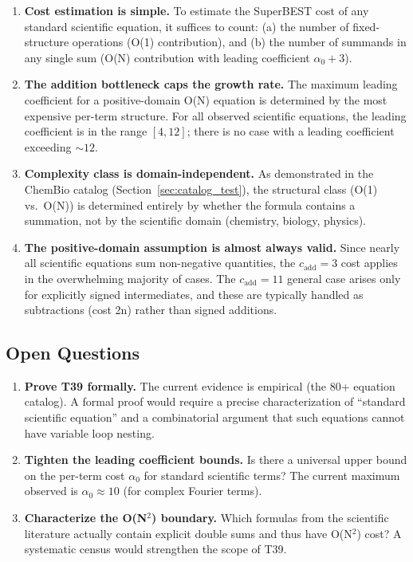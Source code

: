 \documentclass[12pt,a4paper]{article}
\theoremstyle{definition}
\begin{document}
\begin{enumerate}
  \item \textbf{Cost estimation is simple.}  To estimate the
        SuperBEST cost of any standard scientific equation, it suffices
        to count: (a) the number of fixed-structure operations (O(1)
        contribution), and (b) the number of summands in any single
        sum (O(N) contribution with leading coefficient $\alpha_0 + 3$).
  \item \textbf{The addition bottleneck caps the growth rate.}
        The maximum leading coefficient for a positive-domain O(N)
        equation is determined by the most expensive per-term structure.
        For all observed scientific equations, the leading coefficient
        is in the range $[4, 12]$; there is no case with a leading
        coefficient exceeding $\sim 12$.
  \item \textbf{Complexity class is domain-independent.}  As
        demonstrated in the ChemBio catalog (Section~\ref{sec:catalog_test}),
        the structural class (O(1) vs.\ O(N)) is determined entirely by
        whether the formula contains a summation, not by the scientific
        domain (chemistry, biology, physics).
  \item \textbf{The positive-domain assumption is almost always valid.}
        Since nearly all scientific equations sum non-negative quantities,
        the $c_{\mathrm{add}} = 3$ cost applies in the overwhelming
        majority of cases.  The $c_{\mathrm{add}} = 11$ general case
        arises only for explicitly signed intermediates, and these are
        typically handled as subtractions (cost 2n) rather than signed
        additions.
\end{enumerate}

\subsection{Open Questions}

\begin{enumerate}
  \item \textbf{Prove T39 formally.}  The current evidence is
        empirical (the 80+ equation catalog).  A formal proof would
        require a precise characterization of ``standard scientific
        equation'' and a combinatorial argument that such equations
        cannot have variable loop nesting.
  \item \textbf{Tighten the leading coefficient bounds.}  Is there
        a universal upper bound on the per-term cost $\alpha_0$ for
        standard scientific terms?  The current maximum observed is
        $\alpha_0 \approx 10$ (for complex Fourier terms).
  \item \textbf{Characterize the O(N$^2$) boundary.}  Which formulas
        from the scientific literature actually contain explicit double
        sums and thus have O(N$^2$) cost?  A systematic census would
        strengthen the scope of T39.
\end{enumerate}
\end{document}
